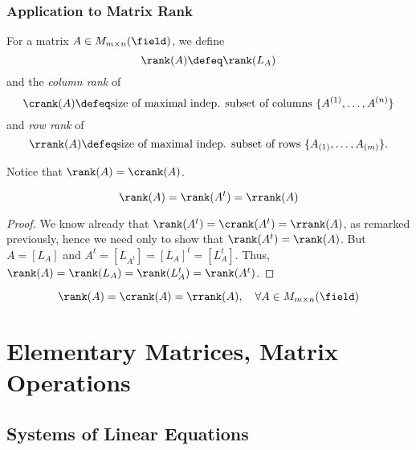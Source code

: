 \subsubsection{Application to Matrix Rank}

\begin{definition}
    For a matrix $A \in M_{m\times n} (\field)$, we define \[
    \rank(A) \defeq \rank(L_A)    
    \]
    and the \emph{column rank} of \[
    \crank(A) \defeq \text{size of maximal indep. subset of columns } \{A^{(1)}, \dots, A^{(n)}\}
    \]
    and \emph{row rank} of \[
    \rrank(A) \defeq \text{size of maximal indep. subset of rows } \{A_{(1)}, \dots, A_{(m)}\}.
    \]
\end{definition}

\begin{remark}
    Notice that $\rank(A) = \crank(A)$.
\end{remark}

\begin{corollary}
    \[
    \rank(A) = \rank(A^t) = \rrank(A)
    \]
\end{corollary}

\begin{proof}
    We know already that $\rank(A^t) = \crank(A^t) = \rrank(A)$, as remarked previously, hence we need only to show that $\rank(A^t) = \rank(A)$. But $A = [L_A]$ and $A^t = [L_{A^t}] = [L_A]^t = [L_A^t]$. Thus, $\rank(A) = \rank(L_A) = \rank(L_A^t) = \rank(A^t)$.
\end{proof}

\begin{corollary}
    $$\rank(A) = \crank(A) = \rrank(A), \quad \forall A \in M_{m \times n}(\field)$$
\end{corollary}

\section{Elementary Matrices, Matrix Operations}
\subsection{Systems of Linear Equations}

